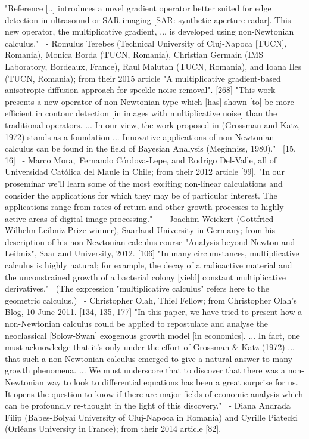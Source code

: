 \documentclass[12pt]{article}
\begin{document}
"Reference [..] introduces a novel gradient operator better suited for edge detection in ultrasound or SAR imaging [SAR: synthetic aperture radar]. This new operator, the multiplicative gradient, ... is developed using non-Newtonian calculus."
 - Romulus Terebes (Technical University of Cluj-Napoca [TUCN], Romania), Monica Borda (TUCN, Romania), Christian Germain (IMS Laboratory, Bordeaux, France), Raul Malutan (TUCN, Romania), and Ioana Iles (TUCN, Romania); from their 2015 article "A multiplicative gradient-based anisotropic diffusion approach for speckle noise removal". [268]
"This work presents a new operator of non-Newtonian type which [has] shown [to] be more efficient in contour detection [in images with multiplicative noise] than the traditional operators. ... In our view, the work proposed in (Grossman and Katz, 1972) stands as a foundation ... Innovative applications of non-Newtonian calculus can be found in the field of Bayesian Analysis (Meginniss, 1980)."  [15, 16]  - Marco Mora, Fernando Córdova-Lepe, and Rodrigo Del-Valle, all of Universidad Católica del Maule in Chile; from their 2012 article [99].
"In our proseminar we'll learn some of the most exciting non-linear calculations and consider the applications for which they may be of particular interest. The applications range from rates of return and other growth processes to highly active areas of digital image processing."  -  Joachim Weickert (Gottfried Wilhelm Leibniz Prize winner), Saarland University in Germany; from his description of his non-Newtonian calculus course "Analysis beyond Newton and Leibniz", Saarland University, 2012. [106]
"In many circumstances, multiplicative calculus is highly natural; for example, the decay of a radioactive material and the unconstrained growth of a bacterial colony [yield] constant multiplicative derivatives."  (The expression "multiplicative calculus" refers here to the geometric calculus.)  - Christopher Olah, Thiel Fellow; from Christopher Olah's Blog, 10 June 2011. [134, 135, 177]
"In this paper, we have tried to present how a non-Newtonian calculus could be applied to repostulate and analyse the neoclassical [Solow-Swan] exogenous growth model [in economics]. ... In fact, one must acknowledge that it’s only under the effort of Grossman & Katz (1972) ... that such a non-Newtonian calculus emerged to give a natural answer to many growth phenomena. ... We must underscore that to discover that there was a non-Newtonian way to look to differential equations has been a great surprise for us. It opens the question to know if there are major fields of economic analysis which can be profoundly re-thought in the light of this discovery."  - Diana Andrada Filip (Babes-Bolyai University of Cluj-Napoca in Romania) and Cyrille Piatecki (Orléans University in France); from their 2014 article [82].
\end{document}
